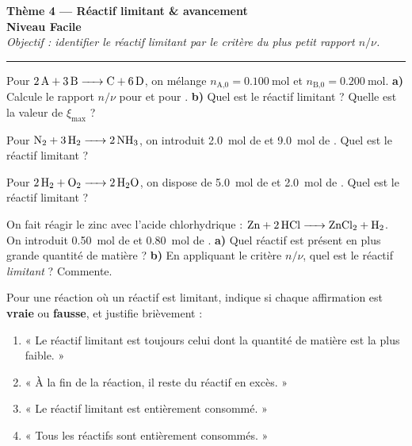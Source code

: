 \documentclass[11pt,a4paper]{article}
\newcommand{\nq}[1]{n_{\text{#1}}}
\begin{document}
\begin{center}
{\LARGE\bfseries\color{primarydark}Thème 4 — Réactif limitant \& avancement}\\[1pt]
{\large\color{excol}\textbf{Niveau Facile}}\\[2pt]
{\itshape Objectif : identifier le réactif limitant par le critère du plus petit rapport $n/\nu$.}\\
{\color{primary}\rule{0.62\linewidth}{1pt}}
\end{center}

\begin{exo}
Pour $\ce{2 A + 3 B -> C + 6 D}$, on mélange $\nq{A,0}=\SI{0,100}{\mole}$ et $\nq{B,0}=\SI{0,200}{\mole}$.
\textbf{a)} Calcule le rapport $n/\nu$ pour  et pour .\quad
\textbf{b)} Quel est le réactif limitant ? Quelle est la valeur de $\xi_{\max}$ ?
\end{exo}

\begin{exo}
Pour $\ce{N2 + 3 H2 -> 2 NH3}$, on introduit \SI{2,0}{\mole} de  et \SI{9,0}{\mole} de .
Quel est le réactif limitant ?
\end{exo}

\begin{exo}
Pour $\ce{2 H2 + O2 -> 2 H2O}$, on dispose de \SI{5,0}{\mole} de  et \SI{2,0}{\mole} de .
Quel est le réactif limitant ?
\end{exo}

\begin{exo}
On fait réagir le zinc avec l'acide chlorhydrique : $\ce{Zn + 2 HCl -> ZnCl2 + H2}$.
On introduit \SI{0,50}{\mole} de  et \SI{0,80}{\mole} de .
\textbf{a)} Quel réactif est présent en plus grande quantité de matière ?\quad
\textbf{b)} En appliquant le critère $n/\nu$, quel est le réactif \emph{limitant} ? Commente.
\end{exo}

\begin{exo}
Pour une réaction où un réactif est limitant, indique si chaque affirmation est \textbf{vraie}
ou \textbf{fausse}, et justifie brièvement :
\begin{enumerate}[label=\arabic*.,leftmargin=1.8em,topsep=1pt,itemsep=1pt]
  \item « Le réactif limitant est toujours celui dont la quantité de matière est la plus faible. »
  \item « À la fin de la réaction, il reste du réactif en excès. »
  \item « Le réactif limitant est entièrement consommé. »
  \item « Tous les réactifs sont entièrement consommés. »
\end{enumerate}
\end{exo}
\end{document}
